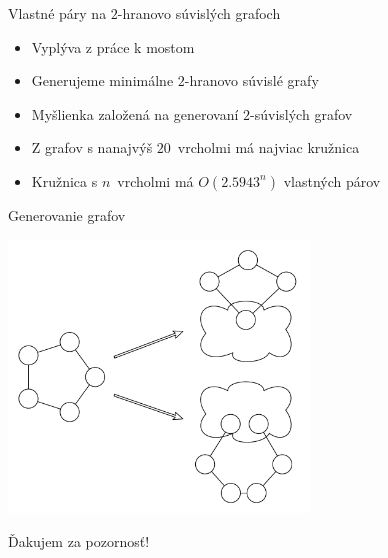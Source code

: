 \documentclass[slovak]{beamer}
\begin{document}
\begin{frame}{Vlastné páry na $2$-hranovo súvislých grafoch}
    \begin{itemize}
        \item Vyplýva z práce k mostom
        \item Generujeme minimálne $2$-hranovo súvislé grafy
        \item Myšlienka založená na generovaní $2$-súvislých grafov
        \item Z grafov s nanajvýš $20$ vrcholmi má najviac kružnica
        \item Kružnica s $n$ vrcholmi má $O(2.5943^n)$ vlastných párov
    \end{itemize}
\end{frame}

\begin{frame}{Generovanie grafov}
    \begin{center}
        \includegraphics[width=0.6\textwidth]{grafy/gengraph.pdf}
    \end{center}
\end{frame}

\begin{frame}[plain,c]

\begin{center}
\Huge Ďakujem za pozornosť!
\end{center}

\end{frame}
\end{document}
